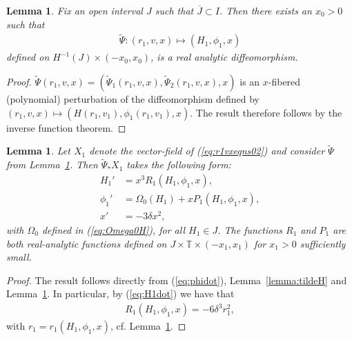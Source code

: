 \documentclass[reqno,12pt]{amsart}
\newcommand{\eqlab}[1]{\label{eq:#1}}
\renewcommand{\eqref}[1]{(\ref{eq:#1})}
\newcommand{\lemmaref}[1]{Lemma~\ref{lemma:#1}}
\newcommand{\lemmalab}[1]{\label{lemma:#1}}
\newtheorem{lemma}[theorem]{Lemma}
\numberwithin{equation}{section}
\begin{document}
\begin{lemma}\lemmalab{tildePsi}
Fix an open interval $J$ such that $\overline J\subset I$. Then there exists an $x_0>0$ such that 
\begin{align*}
 \widetilde \Psi: (r_1,v,x)\mapsto (
                                 H_1,
                                 \phi_1,
                                 x
                                  )
\end{align*}
defined on $H^{-1}(J)\times (-x_0,x_0)$, is a real analytic diffeomorphism.
\end{lemma}
\begin{proof}
 $\widetilde \Psi(r_1,v,x) = (\widetilde \Psi_1(r_1,v,x),\widetilde \Psi_2(r_1,v,x),x)$ is an $x$-fibered (polynomial) perturbation of the diffeomorphism defined by $(r_1,v,x)\mapsto (H(r_1,v_1),\phi_1(r_1,v_1),x)$. The result therefore follows by the inverse function theorem.
\end{proof}

\begin{lemma}
Let $X_1$ denote the vector-field of \eqref{r1vxeqns02} and consider $\widetilde \Psi$ from \lemmaref{tildePsi}. Then $\widetilde \Psi_* X_1$ takes the following form:
 \begin{equation}\eqlab{Hphixeqns}
\begin{aligned}
 {H}_1' &= x^3 R_1(H_1,\phi_1,x),\\
 \phi_1' & = \Omega_0(H_1)+x P_1(H_1,\phi_1,x),\\
 x' &= -3\delta x^2,
\end{aligned}
\end{equation}
with $\Omega_0$ defined in \eqref{Omega0H}, for all $H_1\in J$. The functions $R_1$ and $P_1$ are both real-analytic functions defined  on $J\times \mathbb T \times (-x_1,x_1)$ for $x_1>0$ sufficiently small. 
\end{lemma}
\begin{proof}
 The result follows directly from \eqref{phidot}, \lemmaref{tildeH} and \lemmaref{tildePsi}. In particular, by \eqref{H1dot} we have that 
 \begin{align*}
  R_1(H_1,\phi_1,x) = -6\delta^3 r_1^2,
 \end{align*}
with $r_1=r_1(H_1,\phi_1,x)$, cf. \lemmaref{tildePsi}.
\end{proof}

\end{document}
